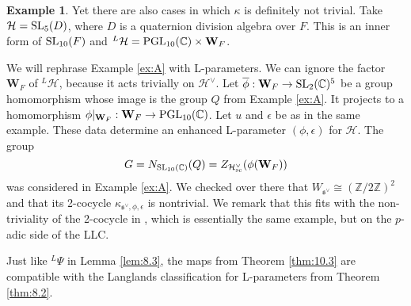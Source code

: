 \documentclass[11pt]{amsart}
\theoremstyle{definition}
\newtheorem{ex}[thm]{Example}
\newcommand{\mb}{\mathbf}
\newcommand{\Z}{\mathbb Z}
\newcommand{\C}{\mathbb C}
\def\PGL{{\rm PGL}}
\def\SL{{\rm SL}}
\def\cH{{\mathcal H}}
\def\fs{{\mathfrak s}}
\def\sc{{\rm sc}}
\begin{document}
\begin{ex}\label{ex:B}
Yet there are also cases in which $\kappa$ is definitely not trivial. Take 
$\cH = \SL_5 (D)$, where $D$ is a quaternion division algebra over $F$. This is an 
inner form of $\SL_{10}(F)$ and ${}^L \cH = \PGL_{10}(\C) \times \mb W_F$. 

We will rephrase Example \ref{ex:A} with L-parameters. We can ignore the factor 
$\mb W_F$ of ${}^L \cH$, because it acts trivially on $\cH^\vee$.
Let $\overline{\phi} : \mb W_F \to \SL_2 (\C)^5$ be a group homomorphism whose image
is the group $Q$ from Example \ref{ex:A}. It projects to a homomorphism $\phi |_{\mb W_F}:
\mb W_F \to \PGL_{10}(\C)$. Let $u$ and $\epsilon$ be as in the same example.
These data determine an enhanced L-parameter $(\phi,\epsilon)$ for $\cH$.
The group 
\[
G = N_{\SL_{10}(\C)}(Q) = Z_{\cH^\vee_{\sc}}(\phi (\mb W_F))
\] 
was considered in Example \ref{ex:A}. We checked over there that $W_{\fs^\vee} \cong 
(\Z / 2 \Z)^2$ and that its 2-cocycle $\kappa_{\fs^\vee,\phi,\epsilon}$ is nontrivial. 
We remark that this fits with the non-triviality of the 2-cocycle in 
\cite[Example 5.5]{ABPS4}, which is essentially the same example, but on the $p$-adic
side of the LLC.
\end{ex}

Just like ${}^L \Psi$ in Lemma \ref{lem:8.3}, the maps from Theorem \ref{thm:10.3}
are compatible with the Langlands classification for L-parameters from Theorem 
\ref{thm:8.2}.
\end{document}
